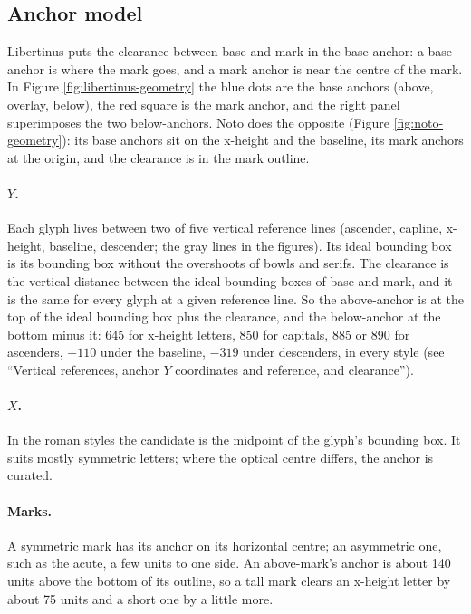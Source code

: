 \documentclass[landscape]{article}
\begin{document}
\clearpage
\subsection*{Anchor model}

Libertinus puts the clearance between base and mark in the base anchor:
a base anchor is where the mark goes, and a mark anchor is near the centre of the mark.
In Figure \ref{fig:libertinus-geometry} the blue dots are the base anchors (above, overlay, below),
the red square is the mark anchor, and the right panel superimposes the two below-anchors.
Noto does the opposite (Figure \ref{fig:noto-geometry}): its base anchors sit on the x-height and the baseline,
its mark anchors at the origin, and the clearance is in the mark outline.

\paragraph{$Y$.}
Each glyph lives between two of five vertical reference lines (ascender, capline, x-height, baseline, descender; the gray lines in the figures).
Its ideal bounding box is its bounding box without the overshoots of bowls and serifs.
The clearance is the vertical distance between the ideal bounding boxes of base and mark, and it is the same for every glyph at a given reference line.
So the above-anchor is at the top of the ideal bounding box plus the clearance, and the below-anchor at the bottom minus it:
645 for x-height letters, 850 for capitals, 885 or 890 for ascenders, $-110$ under the baseline, $-319$ under descenders,
in every style (see ``Vertical references, anchor $Y$ coordinates and reference, and clearance'').

\paragraph{$X$.}
In the roman styles the candidate is the midpoint of the glyph's bounding box.
It suits mostly symmetric letters; where the optical centre differs, the anchor is curated.

\paragraph{Marks.}
A symmetric mark has its anchor on its horizontal centre; an asymmetric one, such as the acute, a few units to one side.
An above-mark's anchor is about 140 units above the bottom of its outline,
so a tall mark clears an x-height letter by about 75 units and a short one by a little more.
\end{document}
